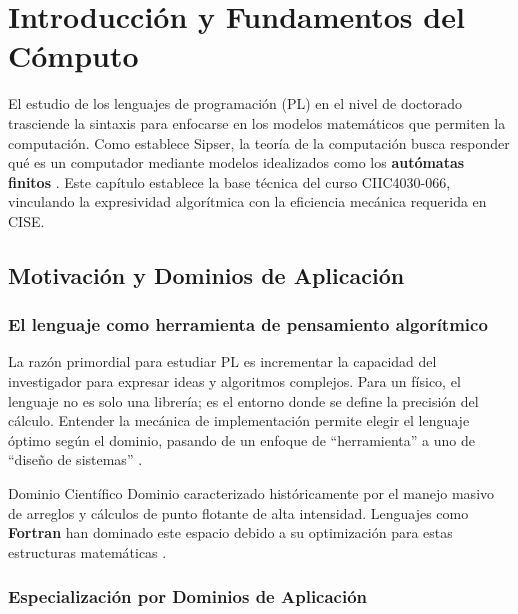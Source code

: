 
\chapter{Introducción y Fundamentos del Cómputo}
\label{ch:introduccion}

El estudio de los lenguajes de programación (PL) en el nivel de doctorado trasciende la sintaxis para enfocarse en los modelos matemáticos que permiten la computación. Como establece Sipser, la teoría de la computación busca responder qué es un computador mediante modelos idealizados como los \textbf{autómatas finitos} \cite{sipser2012introduction}. Este capítulo establece la base técnica del curso CIIC4030-066, vinculando la expresividad algorítmica con la eficiencia mecánica requerida en CISE.

\section{Motivación y Dominios de Aplicación}
\label{sec:1_1_motivacion_dominios}

\subsection{El lenguaje como herramienta de pensamiento algorítmico}

La razón primordial para estudiar PL es incrementar la capacidad del investigador para expresar ideas y algoritmos complejos. Para un físico, el lenguaje no es solo una librería; es el entorno donde se define la precisión del cálculo. Entender la mecánica de implementación permite elegir el lenguaje óptimo según el dominio, pasando de un enfoque de “herramienta” a uno de “diseño de sistemas” \cite{sebesta2019concepts}.

\begin{definicion}{Dominio Científico}
Dominio caracterizado históricamente por el manejo masivo de arreglos y cálculos de punto flotante de alta intensidad. Lenguajes como \textbf{Fortran} han dominado este espacio debido a su optimización para estas estructuras matemáticas \cite{sebesta2019concepts}.
\end{definicion}

\subsection{Especialización por Dominios de Aplicación}

